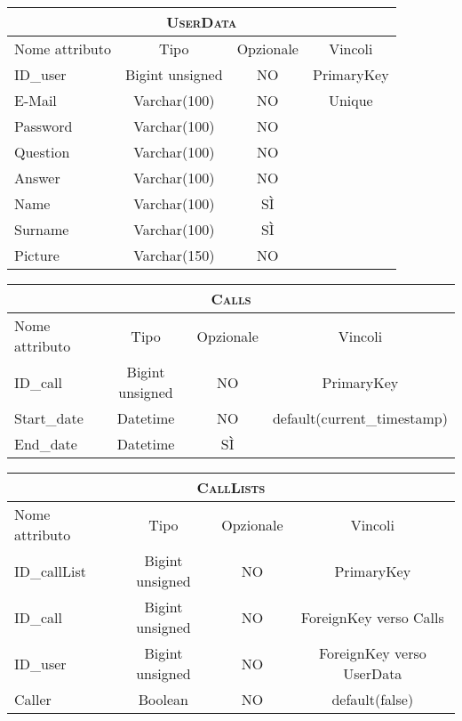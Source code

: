 \begin{center}

\begin{tabular}{lccc}
\toprule
\multicolumn{4}{c}{\scshape\bfseries UserData}\\
\midrule
Nome attributo & Tipo & Opzionale & Vincoli\\
\midrule
ID\_user & Bigint unsigned & NO & PrimaryKey\\
E-Mail & Varchar(100) & NO & Unique\\
Password & Varchar(100) & NO &\\
Question & Varchar(100) & NO &\\
Answer & Varchar(100) & NO &\\
Name & Varchar(100) & SÌ &\\
Surname & Varchar(100) & SÌ &\\
Picture & Varchar(150) & NO &\\
\bottomrule
\end{tabular}

\bigskip

\begin{tabular}{lccc}
\toprule
\multicolumn{4}{c}{\scshape\bfseries Calls}\\
\midrule
Nome attributo & Tipo & Opzionale & Vincoli\\
\midrule
ID\_call & Bigint unsigned & NO & PrimaryKey\\
Start\_date & Datetime & NO & default(current\_timestamp)\\
End\_date & Datetime & SÌ &\\
\bottomrule
\end{tabular}

\bigskip

\begin{tabular}{lccc}
\toprule
\multicolumn{4}{c}{\scshape\bfseries CallLists}\\
\midrule
Nome attributo & Tipo & Opzionale & Vincoli\\
\midrule
ID\_callList & Bigint unsigned & NO & PrimaryKey\\
ID\_call & Bigint unsigned & NO & ForeignKey verso Calls\\
ID\_user & Bigint unsigned & NO & ForeignKey verso UserData \\
Caller & Boolean & NO & default(false)\\
\bottomrule
\end{tabular}


\end{center}
